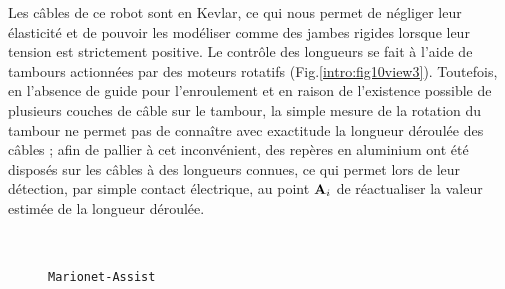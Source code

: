 Les câbles de ce robot sont en Kevlar, ce qui nous permet de négliger leur 
élasticité et de pouvoir les modéliser comme des jambes rigides lorsque leur 
tension est strictement positive. Le contrôle des longueurs se fait à l'aide de 
tambours actionnées par des moteurs rotatifs (Fig.\ref{intro:fig10view3}). 
Toutefois, en l'absence de guide pour l'enroulement et en raison de l'existence 
possible de plusieurs couches de câble sur le tambour, la simple mesure de la 
rotation du tambour ne permet pas de connaître avec exactitude la longueur 
déroulée des câbles ; afin de pallier à cet inconvénient, des rep\`eres en 
aluminium ont été disposés sur les câbles à des longueurs connues, ce qui 
permet lors de leur détection, par simple contact \'electrique, au point ${\bf 
A}_i$ de réactualiser la valeur 
estimée de la longueur déroulée.

\begin{figure}[htp]
  \centering
 \hfill
\\
\hfill
    \caption{\footnotesize{{\tt Marionet-Assist}}}
\label{intro:fig10}
\end{figure}

